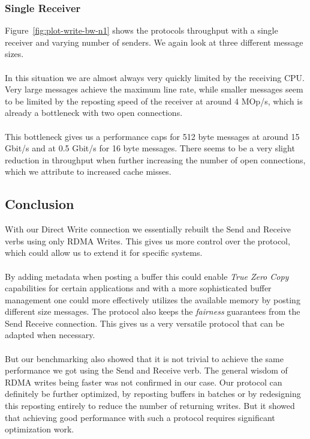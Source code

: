 \subsubsection{Single Receiver}

Figure~\ref{fig:plot-write-bw-n1} shows the protocols throughput with a single receiver and varying number of senders.
We again look at three different message sizes. 

\paragraph{} In this situation we are almost always very quickly limited by the receiving CPU. Very large messages achieve the maximum 
line rate,  while smaller messages seem to be limited by the reposting speed of the receiver at around 4 MOp/s, which is 
already a bottleneck with two open connections.

\paragraph{} This bottleneck gives us a performance caps for 512 byte messages at around 15 Gbit/s and at 0.5 Gbit/s for 16 byte messages.
There seems to be a very slight reduction in throughput when further increasing the number of open connections, which we 
attribute to increased cache misses.

\subsection{Conclusion}

With our Direct Write connection we essentially rebuilt the Send and Receive verbs using only RDMA Writes. This gives us more
control over the protocol, which could allow us to extend it for specific systems.

\paragraph{} By adding metadata when posting a buffer this could enable \emph{True Zero Copy} capabilities for certain 
applications and with a more sophisticated buffer management one could more effectively utilizes the available memory by 
posting different size messages. The protocol also keeps the \emph{fairness} guarantees from the Send Receive connection. 
This gives us a very versatile protocol that can be adapted when necessary.

\paragraph{} But our benchmarking also showed that it is not trivial to achieve the same performance we got using the Send
and Receive verb. The general wisdom of RDMA writes being faster was not confirmed in our case. Our protocol can 
definitely be further optimized, by reposting buffers in batches or by redesigning this reposting entirely to reduce
the number of returning writes. But it showed that achieving good performance with such a protocol requires significant 
optimization work.








